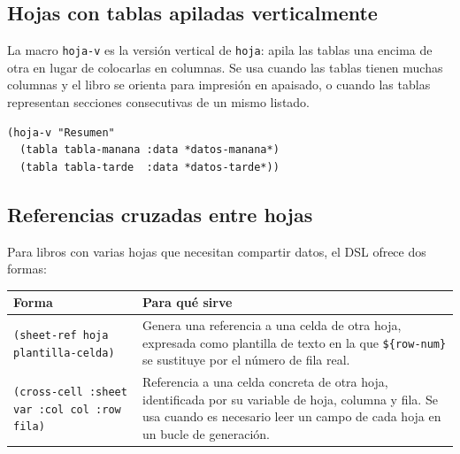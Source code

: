 \documentclass[12pt,a4paper]{report}
\begin{document}
\subsection*{Hojas con tablas apiladas verticalmente}

La macro \texttt{hoja-v} es la versión vertical de \texttt{hoja}: apila
las tablas una encima de otra en lugar de colocarlas en columnas.
Se usa cuando las tablas tienen muchas columnas y el libro se orienta para
impresión en apaisado, o cuando las tablas representan secciones
consecutivas de un mismo listado.

\begin{lstlisting}
(hoja-v "Resumen"
  (tabla tabla-manana :data *datos-manana*)
  (tabla tabla-tarde  :data *datos-tarde*))
\end{lstlisting}

\subsection*{Referencias cruzadas entre hojas}

Para libros con varias hojas que necesitan compartir datos, el DSL ofrece
dos formas:

\begin{center}
\begin{tabular}{lp{8cm}}
\toprule
\textbf{Forma} & \textbf{Para qué sirve} \\
\midrule
\texttt{(sheet-ref hoja plantilla-celda)} & Genera una referencia a una
  celda de otra hoja, expresada como plantilla de texto en la que
  \texttt{\$\{row-num\}} se sustituye por el número de fila real. \\
\texttt{(cross-cell :sheet var :col col :row fila)} & Referencia a una celda
  concreta de otra hoja, identificada por su variable de hoja, columna y fila.
  Se usa cuando es necesario leer un campo de cada hoja en un bucle de
  generación. \\
\bottomrule
\end{tabular}
\end{center}
\end{document}
